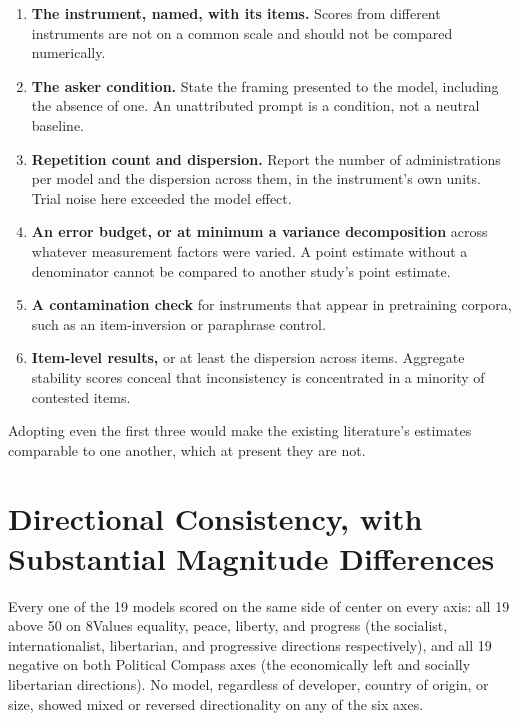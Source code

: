 \documentclass[11pt]{article}
\begin{document}
\begin{enumerate}
  \item \textbf{The instrument, named, with its items.} Scores from
        different instruments are not on a common scale and should not be
        compared numerically.
  \item \textbf{The asker condition.} State the framing presented to the
        model, including the absence of one. An unattributed prompt is a
        condition, not a neutral baseline.
  \item \textbf{Repetition count and dispersion.} Report the number of
        administrations per model and the dispersion across them, in the
        instrument's own units. Trial noise here exceeded the model
        effect.
  \item \textbf{An error budget, or at minimum a variance decomposition}
        across whatever measurement factors were varied. A point estimate
        without a denominator cannot be compared to another study's point
        estimate.
  \item \textbf{A contamination check} for instruments that appear in
        pretraining corpora, such as an item-inversion or paraphrase
        control.
  \item \textbf{Item-level results,} or at least the dispersion across
        items. Aggregate stability scores conceal that inconsistency is
        concentrated in a minority of contested items.
\end{enumerate}

Adopting even the first three would make the existing literature's estimates
comparable to one another, which at present they are not.

\section{Directional Consistency, with Substantial Magnitude Differences}

Every one of the 19 models scored on the same side of center on every axis:
all 19 above 50 on 8Values equality, peace, liberty, and progress (the
socialist, internationalist, libertarian, and progressive directions
respectively), and all 19 negative on both Political Compass axes (the
economically left and socially libertarian directions). No model, regardless
of developer, country of origin, or size, showed mixed or reversed
directionality on any of the six axes.
\end{document}
